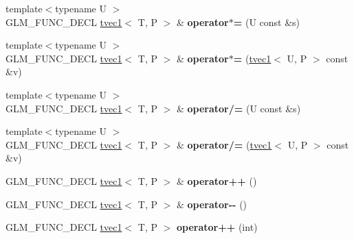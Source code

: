 \begin{DoxyCompactItemize}
\item 
\hypertarget{structglm_1_1tvec1_a2674427b4e2f7a0e7cb19aadb4fc1245}{{\footnotesize template$<$typename U $>$ }\\G\-L\-M\-\_\-\-F\-U\-N\-C\-\_\-\-D\-E\-C\-L \hyperlink{structglm_1_1tvec1}{tvec1}$<$ T, P $>$ \& {\bfseries operator$\ast$=} (U const \&s)}\label{structglm_1_1tvec1_a2674427b4e2f7a0e7cb19aadb4fc1245}

\item 
\hypertarget{structglm_1_1tvec1_a3b881fe292b87649ebff1981800039ac}{{\footnotesize template$<$typename U $>$ }\\G\-L\-M\-\_\-\-F\-U\-N\-C\-\_\-\-D\-E\-C\-L \hyperlink{structglm_1_1tvec1}{tvec1}$<$ T, P $>$ \& {\bfseries operator$\ast$=} (\hyperlink{structglm_1_1tvec1}{tvec1}$<$ U, P $>$ const \&v)}\label{structglm_1_1tvec1_a3b881fe292b87649ebff1981800039ac}

\item 
\hypertarget{structglm_1_1tvec1_a9c7b5352502e133e1b7c4022a90bec22}{{\footnotesize template$<$typename U $>$ }\\G\-L\-M\-\_\-\-F\-U\-N\-C\-\_\-\-D\-E\-C\-L \hyperlink{structglm_1_1tvec1}{tvec1}$<$ T, P $>$ \& {\bfseries operator/=} (U const \&s)}\label{structglm_1_1tvec1_a9c7b5352502e133e1b7c4022a90bec22}

\item 
\hypertarget{structglm_1_1tvec1_a09ef15d7a57cbcf441eb01d3fc832b5d}{{\footnotesize template$<$typename U $>$ }\\G\-L\-M\-\_\-\-F\-U\-N\-C\-\_\-\-D\-E\-C\-L \hyperlink{structglm_1_1tvec1}{tvec1}$<$ T, P $>$ \& {\bfseries operator/=} (\hyperlink{structglm_1_1tvec1}{tvec1}$<$ U, P $>$ const \&v)}\label{structglm_1_1tvec1_a09ef15d7a57cbcf441eb01d3fc832b5d}

\item 
\hypertarget{structglm_1_1tvec1_a75901b0a0fcaaad3f605db78696d7291}{G\-L\-M\-\_\-\-F\-U\-N\-C\-\_\-\-D\-E\-C\-L \hyperlink{structglm_1_1tvec1}{tvec1}$<$ T, P $>$ \& {\bfseries operator++} ()}\label{structglm_1_1tvec1_a75901b0a0fcaaad3f605db78696d7291}

\item 
\hypertarget{structglm_1_1tvec1_a8669605a7a850935d8cb383f356816ea}{G\-L\-M\-\_\-\-F\-U\-N\-C\-\_\-\-D\-E\-C\-L \hyperlink{structglm_1_1tvec1}{tvec1}$<$ T, P $>$ \& {\bfseries operator-\/-\/} ()}\label{structglm_1_1tvec1_a8669605a7a850935d8cb383f356816ea}

\item 
\hypertarget{structglm_1_1tvec1_a50a161af4f77f2eb306e23d90c82b41f}{G\-L\-M\-\_\-\-F\-U\-N\-C\-\_\-\-D\-E\-C\-L \hyperlink{structglm_1_1tvec1}{tvec1}$<$ T, P $>$ {\bfseries operator++} (int)}\label{structglm_1_1tvec1_a50a161af4f77f2eb306e23d90c82b41f}


\end{DoxyCompactItemize}
